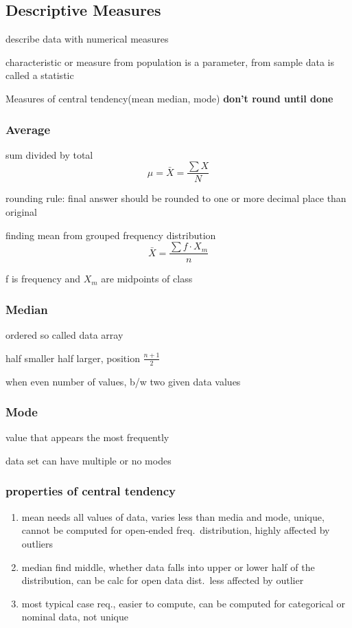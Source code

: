 \documentclass[11pt]{amsart}
\begin{document}
\subsection{Descriptive Measures}
\par describe data with numerical measures
\par characteristic or measure from population is a parameter, from sample
data is called a statistic
\par Measures of central tendency(mean median, mode)
\textbf{don't round until done}
\subsubsection{Average}
\par sum divided by total
\begin{equation*}
  \mu = \bar{X} = \frac{\sum{X}}{N}
\end{equation*}
\par rounding rule: final answer should be rounded to one or more decimal
place than original
\par finding mean from grouped frequency distribution
\begin{equation}
  \bar{X} = \frac{\sum{f \cdot X_m}}{n}
\end{equation}
\par f is frequency and $X_m$ are midpoints of class
\subsubsection{Median}
\par ordered so called data array
\par half smaller half larger, position $\frac{n+1}{2}$
\par when even number of values, b/w two given data values
\subsubsection{Mode}
\par value that appears the most frequently
\par data set can have multiple or no modes
\subsubsection{properties of central tendency}
\begin{enumerate}
  \item mean needs all values of data, varies less than media and mode, unique,
    cannot be computed for open-ended freq.\ distribution, highly affected by outliers
  \item median find middle, whether data falls into upper or lower half of the
    distribution, can be calc for open data dist.\ less affected by outlier
  \item most typical case req., easier to compute, can be computed for categorical or nominal data, not unique
\end{enumerate}
\end{document}
